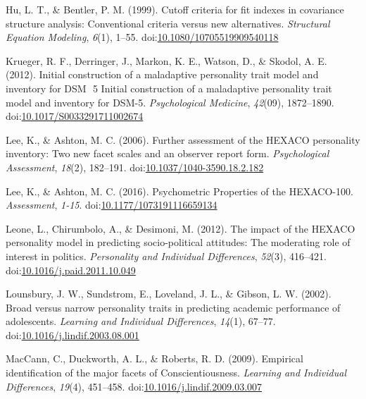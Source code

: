\documentclass[,man]{apa6}
\theoremstyle{definition}
\theoremstyle{definition}
\theoremstyle{definition}
\theoremstyle{remark}
\begin{document}
\leavevmode\hypertarget{ref-Hu1999}{}%
Hu, L. T., \& Bentler, P. M. (1999). Cutoff criteria for fit indexes in
covariance structure analysis: Conventional criteria versus new
alternatives. \emph{Structural Equation Modeling}, \emph{6}(1), 1--55.
doi:\href{https://doi.org/10.1080/10705519909540118}{10.1080/10705519909540118}

\leavevmode\hypertarget{ref-Krueger2012a}{}%
Krueger, R. F., Derringer, J., Markon, K. E., Watson, D., \& Skodol, A.
E. (2012). Initial construction of a maladaptive personality trait model
and inventory for DSM ­ 5 Initial construction of a maladaptive
personality trait model and inventory for DSM-5. \emph{Psychological
Medicine}, \emph{42}(09), 1872--1890.
doi:\href{https://doi.org/10.1017/S0033291711002674}{10.1017/S0033291711002674}

\leavevmode\hypertarget{ref-Lee2006}{}%
Lee, K., \& Ashton, M. C. (2006). Further assessment of the HEXACO
personality inventory: Two new facet scales and an observer report form.
\emph{Psychological Assessment}, \emph{18}(2), 182--191.
doi:\href{https://doi.org/10.1037/1040-3590.18.2.182}{10.1037/1040-3590.18.2.182}

\leavevmode\hypertarget{ref-Lee2016}{}%
Lee, K., \& Ashton, M. C. (2016). Psychometric Properties of the
HEXACO-100. \emph{Assessment}, \emph{1-15}.
doi:\href{https://doi.org/10.1177/1073191116659134}{10.1177/1073191116659134}

\leavevmode\hypertarget{ref-Leone2012}{}%
Leone, L., Chirumbolo, A., \& Desimoni, M. (2012). The impact of the
HEXACO personality model in predicting socio-political attitudes: The
moderating role of interest in politics. \emph{Personality and
Individual Differences}, \emph{52}(3), 416--421.
doi:\href{https://doi.org/10.1016/j.paid.2011.10.049}{10.1016/j.paid.2011.10.049}

\leavevmode\hypertarget{ref-Lounsbury2002}{}%
Lounsbury, J. W., Sundstrom, E., Loveland, J. L., \& Gibson, L. W.
(2002). Broad versus narrow personality traits in predicting academic
performance of adolescents. \emph{Learning and Individual Differences},
\emph{14}(1), 67--77.
doi:\href{https://doi.org/10.1016/j.lindif.2003.08.001}{10.1016/j.lindif.2003.08.001}

\leavevmode\hypertarget{ref-MacCann2009}{}%
MacCann, C., Duckworth, A. L., \& Roberts, R. D. (2009). Empirical
identification of the major facets of Conscientiousness. \emph{Learning
and Individual Differences}, \emph{19}(4), 451--458.
doi:\href{https://doi.org/10.1016/j.lindif.2009.03.007}{10.1016/j.lindif.2009.03.007}
\end{document}
